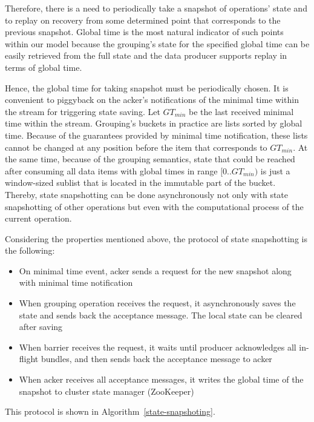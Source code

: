 Therefore, there is a need to periodically take a snapshot of operations' state and to replay on recovery from some determined point that corresponds to the previous snapshot. Global time is the most natural indicator of such points within our model because the grouping's state for the specified global time can be easily retrieved from the full state and the data producer supports replay in terms of global time.   

Hence, the global time for taking snapshot must be periodically chosen. It is convenient to piggyback on the acker's notifications of the minimal time within the stream for triggering state saving. Let $GT_{min}$ be the last received minimal time within the stream. Grouping's buckets in practice are lists sorted by global time. Because of the guarantees provided by minimal time notification, these lists cannot be changed at any position before the item that corresponds to $GT_{min}$. At the same time, because of the grouping semantics, state that could be reached after consuming all data items with global times in range $[0..GT_{min})$ is just a window-sized sublist that is located in the immutable part of the bucket. Thereby, state snapshotting can be done asynchronously not only with state snapshotting of other operations but even with the computational process of the current operation. 

Considering the properties mentioned above, the protocol of state snapshotting is the following:

\begin{itemize}
    \item On minimal time event, acker sends a request for the new snapshot along with minimal time notification
    \item When grouping operation receives the request, it asynchronously saves the state and sends back the acceptance message. The local state can be cleared after saving
    \item When barrier receives the request, it waits until producer acknowledges all in-flight bundles, and then sends back the acceptance message to acker
    \item When acker receives all acceptance messages, it writes the global time of the snapshot to cluster state manager (ZooKeeper) 
\end{itemize}

This protocol is shown in Algorithm~\ref{state-snapshoting}.

